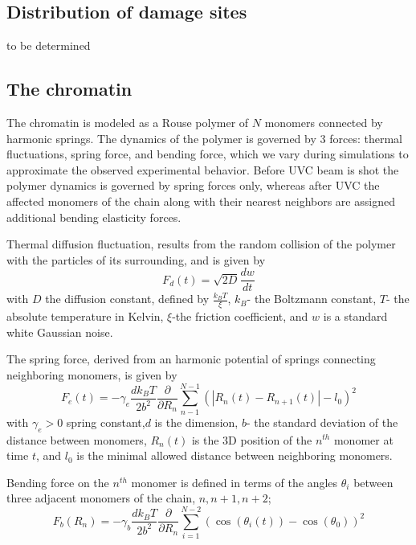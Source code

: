 \documentclass[12pt]{report}
\begin{document}
	\subsection{Distribution of damage sites}
	to be determined
	
				    
	\subsection{The chromatin}	
     The chromatin is modeled as a Rouse polymer of $N$ monomers connected by harmonic springs. The dynamics of the polymer is governed by 3 forces: thermal fluctuations, spring force, and bending force, which we vary during simulations to approximate the observed experimental behavior. Before UVC beam is shot the polymer dynamics is governed by spring forces only, whereas after UVC the affected monomers of the chain along with their nearest neighbors are assigned additional bending elasticity forces. 
     
     Thermal diffusion fluctuation, results from the random collision of the polymer with the particles of its surrounding, and is given by 
     \begin{equation*}
     F_d(t) = \sqrt{2D}\frac{dw}{dt}
     \end{equation*}
      with $D$ the diffusion constant, defined by $\frac{k_BT}{\xi}$, $k_B$- the Boltzmann constant, $T$- the absolute temperature in Kelvin, $\xi$-the friction coefficient, and $w$ is a standard white Gaussian noise. 
            
     The spring force, derived from an harmonic potential of springs connecting neighboring monomers, is given by
     \begin{equation*}
      F_e(t) = -\gamma_e\frac{dk_BT}{2b^2}\frac{\partial}{\partial R_n}\sum_{n-1}^{N-1}(|R_n(t)-R_{n+1}(t)| -l_0)^2
     \end{equation*}
     with $\gamma_e>0$ spring constant,$d$ is the dimension, $b$- the standard deviation of the distance between monomers, $R_n(t)$ is the 3D position of the $n^{th}$ monomer at time $t$, and $l_0$ is the minimal allowed distance between neighboring monomers.
     
     Bending force on the $n^{th}$ monomer is defined in terms of the angles $\theta_i$ between three adjacent monomers of the chain, $n,n+1,n+2$;
     \begin{equation*}
     F_b(R_n) = -\gamma_b\frac{dk_BT}{2b^2}\frac{\partial}{\partial R_n}\sum_{i=1}^{N-2}(\cos(\theta_i(t))-\cos(\theta_0))^2
     \end{equation*}
               
\end{document}

